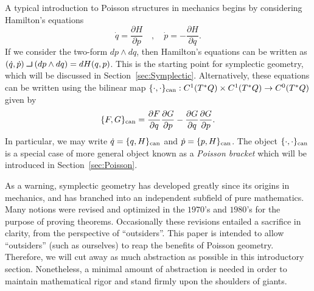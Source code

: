 \documentclass[12pt]{amsart}
\newcommand{\pder}[2]{\ensuremath{\frac{\partial #1}{\partial #2}}}
\def\contract{\makebox[1.2em][c]{\mbox{\rule{.6em}
{.01truein}\rule{.01truein}{.6em}}}}
\begin{document}
A typical introduction to Poisson structures in mechanics
begins by considering Hamilton's equations
\begin{equation*}
  \dot{q} = \pder{H}{p} \quad, \quad  \dot{p} = - \pder{H}{q}.
\end{equation*}
If we consider the two-form $dp \wedge dq$, then Hamilton's equations
can be written as $(\dot{q},\dot{p}) \contract (dp \wedge dq) = dH(q,p)$.
This is the starting point for symplectic geometry, which
will be discussed in Section~\ref{sec:Symplectic}.
Alternatively, these equations can be written using the bilinear map $\{ \cdot , \cdot \}_{\rm can} : C^1( T^*Q) \times C^1(T^*Q) \to C^0(T^*Q)$
given by
\begin{equation*}
  \{ F , G \}_{\rm can} = \pder{F}{q}\pder{G}{p} - \pder{G}{q} \pder{G}{p}.
\end{equation*}
In particular, we may write $\dot{q} = \{ q , H \}_{\rm can}$ and $\dot{p} = \{ p , H\}_{\rm can}$.
The object $\{ \cdot , \cdot \}_{\rm can}$ is a special case of more general
object known as a \emph{Poisson bracket} which will be introduced in
Section~\ref{sec:Poisson}.

As a warning, symplectic geometry has developed greatly
since its origins in mechanics, and
has branched into an independent subfield of pure mathematics.
Many notions were revised and optimized in the $1970$'s and $1980$'s for
the purpose of proving theorems.
Occasionally these revisions entailed a sacrifice
in clarity, from the perspective of ``outsiders''.
This paper is intended to allow ``outsiders''
(such as ourselves) to reap the benefits of Poisson geometry.
Therefore, we will cut away as much abstraction as possible in this introductory
section.
Nonetheless, a minimal amount of abstraction is needed in order to
maintain mathematical rigor and stand firmly upon the shoulders of giants.
\end{document}
